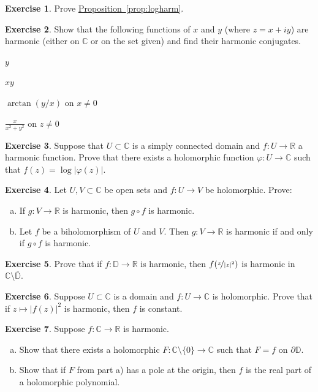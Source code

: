\documentclass[12pt,openany]{book}
\newcommand{\tab}{\qquad}
\newcommand{\sabs}[1]{\lvert {#1} \rvert}
\newcommand{\C}{{\mathbb{C}}}
\newcommand{\R}{{\mathbb{R}}}
\newcommand{\D}{{\mathbb{D}}}
\theoremstyle{plain}
\theoremstyle{remark}
\theoremstyle{definition}
\newenvironment{exbox}{%
    \def\FrameCommand{\vrule width 1pt \relax\hspace{10pt}}%
    \MakeFramed{\advance\hsize-\width\FrameRestore}%
}{%
    \endMakeFramed
}
\newenvironment{exparts}{%
    \leavevmode\begin{enumerate}[a),noitemsep,topsep=0pt,parsep=0pt,partopsep=0pt]
}{%
    \end{enumerate}
}
\newenvironment{expartshor}[1]{%
    \begingroup%
    \NumTabs{#1}%
    \leavevmode%
    \par%
    \begin{enumerate*}[a),itemjoin={\tab}]
}{%
    \end{enumerate*}\endgroup\par
}
\theoremstyle{exercise}
\newtheorem{exercise}{Exercise}[section]
\theoremstyle{example}
\newcommand{\propref}[1]{\hyperref[#1]{Proposition~\ref*{#1}}}
\begin{document}
\begin{savenotes}
\begin{exbox}
\begin{exercise}
Prove \propref{prop:logharm}.
\end{exercise}

\begin{exercise}
Show that the following functions of $x$ and $y$ (where
$z = x+iy$) are
harmonic (either on $\C$ or on the set given)
and find their harmonic conjugates.
\smallskip
\begin{expartshor}{5}
\item
$y$
\item
$xy$
\item
$\arctan(y/x)$ on $x \neq 0$
\item
$\frac{x}{x^2+y^2}$ on $z \neq 0$
\end{expartshor}
\end{exercise}

\begin{exercise}
Suppose that $U \subset \C$ is a simply connected domain
and $f \colon U \to \R$ a harmonic function.  Prove that there exists
a holomorphic function $\varphi \colon U \to \C$ such that
$f(z) = \log \sabs{\varphi(z)}$.
\end{exercise}

\begin{exercise}
Let $U,V \subset \C$ be open sets and
$f \colon U \to V$ be holomorphic. Prove:
\begin{exparts}
\item
If $g \colon V \to \R$ is harmonic, then
$g \circ f$ is harmonic.
\item
Let $f$ be a biholomorphism of $U$ and $V$.
Then $g \colon V \to \R$ is harmonic if and only if
$g \circ f$ is harmonic.
\end{exparts}
\end{exercise}

\begin{exercise}
Prove that if $f \colon \D \to \R$ is harmonic, then
$f(\nicefrac{z}{\sabs{z}^2})$ is harmonic in $\C \setminus
\overline{\D}$.
\end{exercise}

\begin{exercise}
Suppose $U \subset \C$ is a domain and
$f \colon U \to \C$ is holomorphic.  Prove that
if $z \mapsto \sabs{f(z)}^2$ is harmonic, then $f$ is constant.
\end{exercise}

\begin{exercise}
Suppose $f \colon \C \to \R$ is harmonic.
\begin{exparts}
\item
Show that there exists
a holomorphic $F \colon \C \setminus \{ 0 \} \to \C$
such that $F=f$ on $\partial \D$.
\item
Show that if $F$ from part a) has a pole at the origin, then $f$
is the real part of a holomorphic polynomial.
\end{exparts}
\end{exercise}


\end{exbox}
\end{savenotes}
\end{document}
